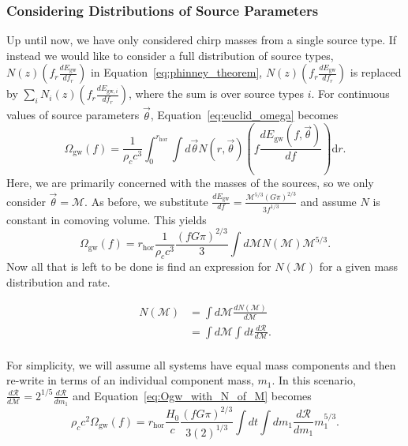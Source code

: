 \documentclass[]{article}
\newcommand{\Ogw}{\Omega_{\mathrm{gw}}}
\newcommand{\rhor}{r_{\text{hor}}}
\begin{document}
\subsubsection{Considering Distributions of Source Parameters}
Up until now, we have only considered chirp masses from a single source type.
If instead we would like to consider a full distribution of source types, $N(z) (f_r \frac{dE_{\mathrm{gw}}}{df_r})$ in Equation~\ref{eq:phinney_theorem}, $N(z) (f_r \frac{dE_{\mathrm{gw}}}{df_r})$ is replaced by $\sum_{i} N_i (z) (f_r \frac{dE_{\mathrm{gw},i}}{df_r})$, where the sum is over source types $i$. 
For continuous values of source parameters $\vec{\theta}$, Equation~\ref{eq:euclid_omega} becomes
\begin{equation*}
\Ogw(f) = \frac{1}{\rho_c c^3 } \int_{0}^{\rhor} \int d\vec{\theta} N(r,\vec{\theta}) (f \frac{dE_{\mathrm{gw}}(f,\vec{\theta})}{df}) \mathrm{d}r .
\end{equation*} 
Here, we are primarily concerned with the masses of the sources, so we only consider $\vec{\theta} = \mathcal{M}$.
As before, we substitute $\frac{dE_{\mathrm{gw}}}{df} = \frac{\mathcal{M}^{5/3}(G\pi)^{2/3}}{3 f^{1/3}}$ and assume $N$ is constant in comoving volume. 
This yields
\begin{equation}
\Ogw(f) =  \rhor \frac{1}{\rho_c c^3 } \frac{(f G \pi)^{2/3}}{3} \int d\mathcal{M} N(\mathcal{M}) \mathcal{M}^{5/3}  .
\label{eq:Ogw_with_N_of_M}
\end{equation}
Now all that is left to be done is find an expression for $N(\mathcal{M})$ for a given mass distribution and rate.

\begin{align*}
 N(\mathcal{M}) &= \int d\mathcal{M} \frac{d N(\mathcal{M})}{d\mathcal{M}} \\
  &= \int d\mathcal{M} \int dt \frac{d\mathcal{R}}{d\mathcal{M}}.\\
\end{align*}

For simplicity, we will assume all systems have equal mass components and then re-write in terms of an individual component mass, $m_1$.
In this scenario, $\frac{d\mathcal{R}}{d\mathcal{M}} = 2^{1/5} \frac{d\mathcal{R}}{d m_1}$ and Equation~\ref{eq:Ogw_with_N_of_M} becomes
\begin{equation}
\rho_c c^2 \Ogw(f) =  \rhor \frac{H_0}{c} \frac{(f G \pi)^{2/3}}{3 (2)^{1/3}} \int d t \int d m_1 \frac{d\mathcal{R}}{dm_1} m_1^{5/3} .
\label{eq:Ogw_with_R_of_M}
\end{equation}
\end{document}
